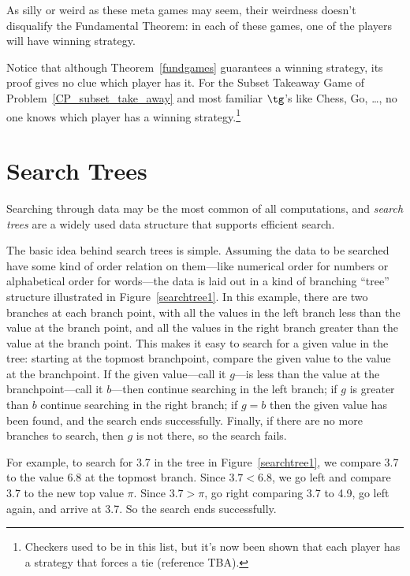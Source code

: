 \begin{definition}
As silly or weird as these meta games may seem, their weirdness
doesn't disqualify the Fundamental Theorem: in each of these games,
one of the players will have winning strategy.

Notice that although Theorem~\ref{fundgames} guarantees a winning
strategy, its proof gives no clue which player has it.  For the Subset
Takeaway Game of Problem~\ref{CP_subset_take_away} and most familiar
$\tg$'s like Chess, Go, \dots, no one knows which player has a winning
strategy.\footnote{Checkers used to be in this list, but it's now been
  shown that each player has a strategy that forces a tie (reference
  TBA).}

\begin{problems}
\practiceproblems
{}

\homeworkproblems
{}
\end{problems}

\section{Search Trees}\label{search_tree}

Searching through data may be the most common of all computations, and
\emph{search trees} are a widely used data structure that supports
efficient search.

The basic idea behind search trees is simple.  Assuming the data to be
searched have some kind of order relation on them---like numerical order
for numbers or alphabetical order for words---the data is laid out in
a kind of branching ``tree'' structure illustrated in
Figure~\ref{searchtree1}.  In this example, there are two branches at
each branch point, with all the values in the left branch less than
the value at the branch point, and all the values in the right branch
greater than the value at the branch point.  This makes it easy to
search for a given value in the tree: starting at the topmost
branchpoint, compare the given value to the value at the branchpoint.
If the given value---call it $g$---is less than the value at the
branchpoint---call it $b$---then continue searching in the left
branch; if $g$ is greater than $b$ continue searching in the right
branch; if $g = b$ then the given value has been found, and the search
ends successfully.  Finally, if there are no more branches to search,
then $g$ is not there, so the search fails.

For example, to search for 3.7 in the tree in Figure~\ref{searchtree1},
we compare 3.7 to the value 6.8 at the topmost branch.  Since $3.7 <
6.8$, we go left and compare $3.7$ to the new top value $\pi$.  Since
$3.7 > \pi$, go right comparing 3.7 to 4.9, go left again, and arrive
at 3.7. So the search ends successfully.


\end{definition}
